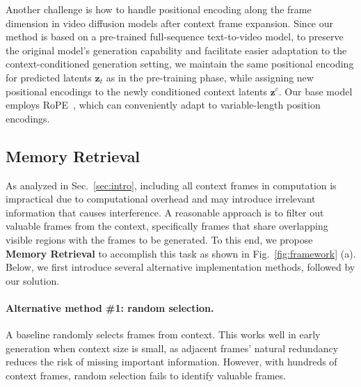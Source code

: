Another challenge is how to handle positional encoding along the frame dimension in video diffusion models after context frame expansion. Since our method is based on a pre-trained full-sequence text-to-video model, to preserve the original model's generation capability and facilitate easier adaptation to the context-conditioned generation setting, we maintain the same positional encoding for predicted latents $\mathbf{z}_t$ as in the pre-training phase, while assigning new positional encodings to the newly conditioned context latents $\mathbf{z}^c$. Our base model employs RoPE~\cite{rope}, which can conveniently adapt to variable-length position encodings.

\subsection{Memory Retrieval}
\label{subsec:acc}
As analyzed in Sec.~\ref{sec:intro}, including all context frames in computation is impractical due to computational overhead and may introduce irrelevant information that causes interference. A reasonable approach is to filter out valuable frames from the context, specifically frames that share overlapping visible regions with the frames to be generated. To this end, we propose \textbf{Memory Retrieval} to accomplish this task as shown in Fig.~\ref{fig:framework} (a). Below, we first introduce several alternative implementation methods, followed by our solution.

\paragraph{Alternative method \#1: random selection.} 
A baseline randomly selects frames from context. This works well in early generation when context size is small, as adjacent frames' natural redundancy reduces the risk of missing important information. However, with hundreds of context frames, random selection fails to identify valuable frames.

